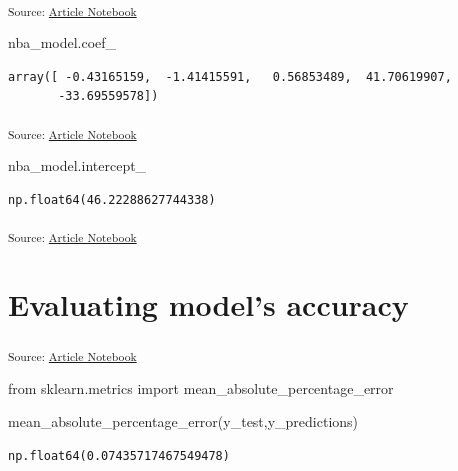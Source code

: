 \documentclass[
  a4paper,
  DIV=11,
  numbers=noendperiod]{scrreprt}
\newenvironment{Shaded}{\begin{snugshade}}{\end{snugshade}}
\newcommand{\ImportTok}[1]{\textcolor[rgb]{0.00,0.46,0.62}{#1}}
\newcommand{\NormalTok}[1]{\textcolor[rgb]{0.00,0.23,0.31}{#1}}
\begin{document}
\textsubscript{Source:
\href{https://sigmadream.github.io/practice-quarto/NBA_2023-24.ipynb.html}{Article
Notebook}}

\begin{Shaded}
\begin{Highlighting}[]
\NormalTok{nba\_model.coef\_}
\end{Highlighting}
\end{Shaded}

\begin{verbatim}
array([ -0.43165159,  -1.41415591,   0.56853489,  41.70619907,
       -33.69559578])
\end{verbatim}

\textsubscript{Source:
\href{https://sigmadream.github.io/practice-quarto/NBA_2023-24.ipynb.html}{Article
Notebook}}

\begin{Shaded}
\begin{Highlighting}[]
\NormalTok{nba\_model.intercept\_}
\end{Highlighting}
\end{Shaded}

\begin{verbatim}
np.float64(46.22288627744338)
\end{verbatim}

\textsubscript{Source:
\href{https://sigmadream.github.io/practice-quarto/NBA_2023-24.ipynb.html}{Article
Notebook}}

\chapter{Evaluating model's accuracy}\label{evaluating-models-accuracy}

\textsubscript{Source:
\href{https://sigmadream.github.io/practice-quarto/NBA_2023-24.ipynb.html}{Article
Notebook}}

\begin{Shaded}
\begin{Highlighting}[]
\ImportTok{from}\NormalTok{ sklearn.metrics }\ImportTok{import}\NormalTok{ mean\_absolute\_percentage\_error}

\NormalTok{mean\_absolute\_percentage\_error(y\_test,y\_predictions)}
\end{Highlighting}
\end{Shaded}

\begin{verbatim}
np.float64(0.07435717467549478)
\end{verbatim}
\end{document}
